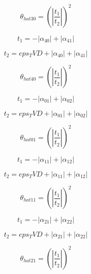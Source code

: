 \documentclass{article}
\begin{document}
\begin{dmath}\theta_{hat 30} = \left(\left|{\frac{t_{1}}{t_{2}}}\right| \right)^{2}\end{dmath}

\begin{dmath}t_{1} = - \left|{\alpha_{40}}\right| + \left|{\alpha_{41}}\right|\end{dmath}

\begin{dmath}t_{2} = eps_TVD + \left|{\alpha_{40}}\right| + \left|{\alpha_{41}}\right|\end{dmath}

\begin{dmath}\theta_{hat 40} = \left(\left|{\frac{t_{1}}{t_{2}}}\right| \right)^{2}\end{dmath}

\begin{dmath}t_{1} = - \left|{\alpha_{01}}\right| + \left|{\alpha_{02}}\right|\end{dmath}

\begin{dmath}t_{2} = eps_TVD + \left|{\alpha_{01}}\right| + \left|{\alpha_{02}}\right|\end{dmath}

\begin{dmath}\theta_{hat 01} = \left(\left|{\frac{t_{1}}{t_{2}}}\right| \right)^{2}\end{dmath}

\begin{dmath}t_{1} = - \left|{\alpha_{11}}\right| + \left|{\alpha_{12}}\right|\end{dmath}

\begin{dmath}t_{2} = eps_TVD + \left|{\alpha_{11}}\right| + \left|{\alpha_{12}}\right|\end{dmath}

\begin{dmath}\theta_{hat 11} = \left(\left|{\frac{t_{1}}{t_{2}}}\right| \right)^{2}\end{dmath}

\begin{dmath}t_{1} = - \left|{\alpha_{21}}\right| + \left|{\alpha_{22}}\right|\end{dmath}

\begin{dmath}t_{2} = eps_TVD + \left|{\alpha_{21}}\right| + \left|{\alpha_{22}}\right|\end{dmath}

\begin{dmath}\theta_{hat 21} = \left(\left|{\frac{t_{1}}{t_{2}}}\right| \right)^{2}\end{dmath}
\end{document}
